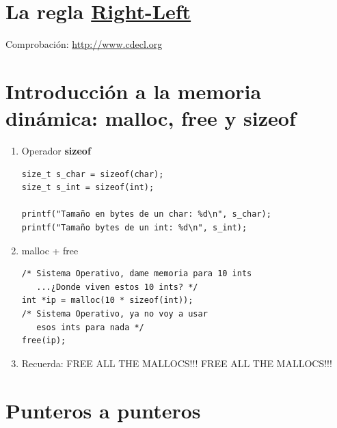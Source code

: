 \documentclass[a4paper,oneside]{article}
\begin{document}
\section{La regla \href{http://ieng9.ucsd.edu/~cs30x/rt_lt.rule.html}{Right-Left}}
Comprobación: \url{http://www.cdecl.org}

\section{Introducción a la memoria dinámica: malloc, free y sizeof}

  \begin{enumerate}
  \item Operador \textbf{sizeof}

    \begin{verbatim}
size_t s_char = sizeof(char);
size_t s_int = sizeof(int);

printf("Tamaño en bytes de un char: %d\n", s_char);
printf("Tamaño bytes de un int: %d\n", s_int);
    \end{verbatim}

  \item malloc + free

  \begin{verbatim}
/* Sistema Operativo, dame memoria para 10 ints
   ...¿Donde viven estos 10 ints? */
int *ip = malloc(10 * sizeof(int));
/* Sistema Operativo, ya no voy a usar 
   esos ints para nada */
free(ip);
  \end{verbatim}

  \item Recuerda: FREE ALL THE MALLOCS!!! FREE ALL THE MALLOCS!!!

  \end{enumerate}

\section{Punteros a punteros}
\end{document}

